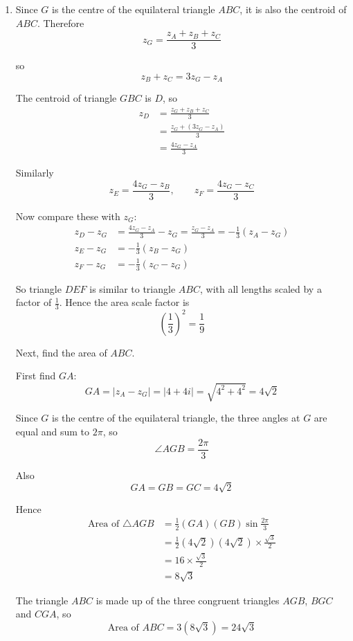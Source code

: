 \documentclass[leqno]{article}
\begin{document}
\begin{enumerate}[
  label=\textbf{\arabic*.},
  leftmargin=*,
  topsep=0pt,
  partopsep=0pt,
  parsep=0pt
]
\begin{djsSolution}
\begin{enumerate}[label=\textbf{(\alph*)}]
  Therefore
  \[
  z_B=(-1-2\sqrt3)+(2\sqrt3-4)i,\qquad
  z_C=(-1+2\sqrt3)-(4+2\sqrt3)i
  \]

  with \(B\) and \(C\) interchangeable.

  \item Since \(G\) is the centre of the equilateral triangle \(ABC\), it is also the centroid of \(ABC\). Therefore
  \[
  z_G=\frac{z_A+z_B+z_C}{3}
  \]

  so
  \[
  z_B+z_C=3z_G-z_A
  \]

  The centroid of triangle \(GBC\) is \(D\), so
  \begin{align*}
  z_D&=\frac{z_G+z_B+z_C}{3} \\
  &=\frac{z_G+(3z_G-z_A)}{3} \\
  &=\frac{4z_G-z_A}{3}
  \end{align*}

  Similarly
  \[
  z_E=\frac{4z_G-z_B}{3},\qquad z_F=\frac{4z_G-z_C}{3}
  \]

  Now compare these with \(z_G\):
  \begin{align*}
  z_D-z_G&=\frac{4z_G-z_A}{3}-z_G=\frac{z_G-z_A}{3}=-\frac13(z_A-z_G) \\
  z_E-z_G&=-\frac13(z_B-z_G) \\
  z_F-z_G&=-\frac13(z_C-z_G)
  \end{align*}

  So triangle \(DEF\) is similar to triangle \(ABC\), with all lengths scaled by a factor of \(\frac13\). Hence the area scale factor is
  \[
  \left(\frac13\right)^2=\frac19
  \]

  Next, find the area of \(ABC\).

  First find \(GA\):
  \[
  GA=|z_A-z_G|=|4+4i|=\sqrt{4^2+4^2}=4\sqrt2
  \]

  Since \(G\) is the centre of the equilateral triangle, the three angles at \(G\) are equal and sum to \(2\pi\), so
  \[
  \angle AGB=\frac{2\pi}{3}
  \]

  Also
  \[
  GA=GB=GC=4\sqrt2
  \]

  Hence
  \begin{align*}
  \text{Area of } \triangle AGB
  &=\frac12(GA)(GB)\sin\frac{2\pi}{3} \\
  &=\frac12(4\sqrt2)(4\sqrt2)\times\frac{\sqrt3}{2} \\
  &=16\times\frac{\sqrt3}{2} \\
  &=8\sqrt3
  \end{align*}

  The triangle \(ABC\) is made up of the three congruent triangles \(AGB\), \(BGC\) and \(CGA\), so
  \[
  \text{Area of }ABC=3(8\sqrt3)=24\sqrt3
  \]


\end{enumerate}
\end{djsSolution}
\end{enumerate}
\end{document}
